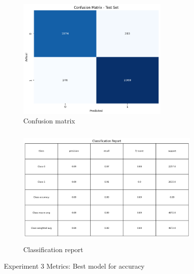 \begin{figure}[!ht]
    \centering
    \begin{subfigure}{0.45\textwidth} %
        \centering
        \includegraphics[height=6cm, width=\linewidth]{images/3.cm.png}
        \caption{Confusion matrix} %
    \end{subfigure}
    \hfill
    \begin{subfigure}{0.45\textwidth} %
        \centering
        \includegraphics[height=6cm, width=\linewidth]{images/3.cr.png}
        \caption{Classification report} %
    \end{subfigure}
    \caption{Experiment 3 Metrics: Best model for accuracy} %
\end{figure}


